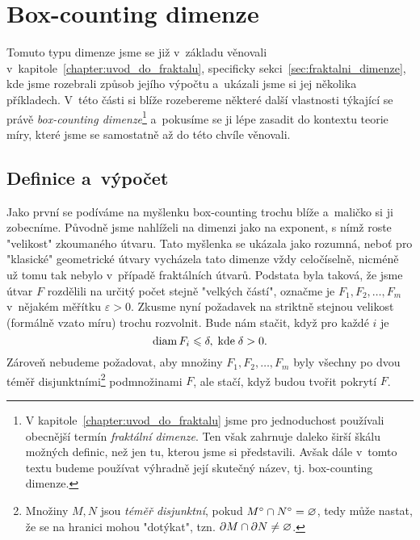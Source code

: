 \section{Box-counting dimenze}\label{sec:box-counting-dimenze}

Tomuto typu dimenze jsme se již v~základu věnovali v~kapitole~\ref{chapter:uvod_do_fraktalu}, specificky sekci~\ref{sec:fraktalni_dimenze}, kde jsme rozebrali způsob jejího výpočtu a~ukázali jsme si jej několika příkladech. V~této části si blíže rozebereme některé další vlastnosti týkající se právě \emph{box-counting dimenze}\footnote{V kapitole~\ref{chapter:uvod_do_fraktalu} jsme pro jednoduchost používali obecnější termín \emph{fraktální dimenze}. Ten však zahrnuje daleko širší škálu možných definic, než jen tu, kterou jsme si představili. Avšak dále v~tomto textu budeme používat výhradně její skutečný název, tj. box-counting dimenze.} a~pokusíme se ji lépe zasadit do kontextu teorie míry, které jsme se samostatně až do této chvíle věnovali.

\subsection{Definice a~výpočet}\label{subsec:definice-a-vypocet-bc-dimenze}

Jako první se podíváme na myšlenku box-counting trochu blíže a~maličko si ji zobecníme. Původně jsme nahlíželi na dimenzi jako na exponent, s nímž roste "velikost" zkoumaného útvaru. Tato myšlenka se ukázala jako rozumná, neboť pro "klasické" geometrické útvary vycházela tato dimenze vždy celočíselně, nicméně už tomu tak nebylo v~případě fraktálních útvarů. Podstata byla taková, že jsme útvar $F$ rozdělili na určitý počet stejně "velkých částí", označme je $F_1,F_2,\ldots,F_m$ v~nějakém měřítku $\varepsilon>0$. Zkusme nyní požadavek na striktně stejnou velikost (formálně vzato míru) trochu rozvolnit. Bude nám stačit, když pro každé $i$ je
\[\operatorname{diam}{F_i}\leqslant\delta,\;\text{kde}\;\delta>0.\]
Zároveň nebudeme požadovat, aby množiny $F_1,F_2,\ldots,F_m$ byly všechny po dvou téměř disjunktními\footnote{Množiny $M,N$ jsou \emph{téměř disjunktní}, pokud $M^\circ\cap N^\circ=\varnothing$, tedy může nastat, že se na hranici mohou "dotýkat", tzn. $\partial M\cap\partial N\neq\varnothing$.} podmnožinami $F$, ale stačí, když budou tvořit pokrytí $F$.

